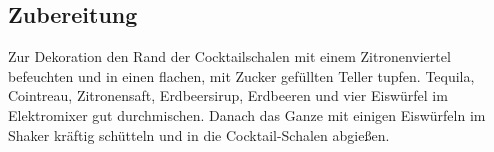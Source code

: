 \subsection*{Zubereitung}
Zur Dekoration den Rand der Cocktailschalen mit einem Zitronenviertel befeuchten und in einen flachen, mit Zucker gefüllten Teller tupfen. Tequila, Cointreau, Zitronensaft, Erdbeersirup, Erdbeeren und vier Eiswürfel im Elektromixer gut durchmischen. Danach das Ganze mit einigen Eiswürfeln im Shaker kräftig schütteln und in die Cocktail-Schalen abgießen. 	